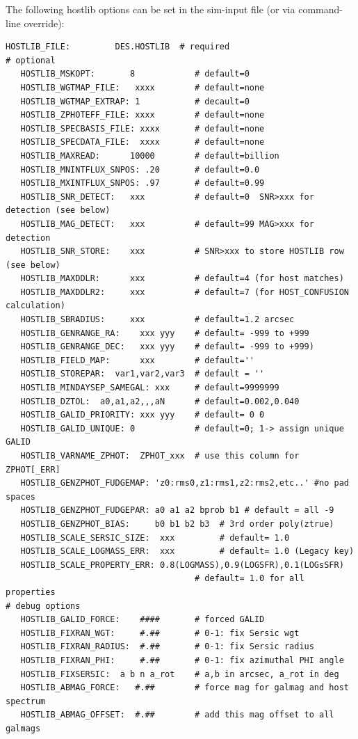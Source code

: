 \documentclass[12pt]{article}
\newcommand{\hostlib}{{\sc hostlib}}
\begin{document}
{The following {\hostlib} options can be set in
the sim-input file (or via command-line override):
%
\begin{Verbatim}[frame=single]
   HOSTLIB_FILE:         DES.HOSTLIB  # required
# optional
   HOSTLIB_MSKOPT:       8            # default=0
   HOSTLIB_WGTMAP_FILE:   xxxx        # default=none
   HOSTLIB_WGTMAP_EXTRAP: 1           # decault=0
   HOSTLIB_ZPHOTEFF_FILE: xxxx        # default=none
   HOSTLIB_SPECBASIS_FILE: xxxx       # default=none
   HOSTLIB_SPECDATA_FILE:  xxxx       # default=none
   HOSTLIB_MAXREAD:      10000        # default=billion
   HOSTLIB_MNINTFLUX_SNPOS: .20       # default=0.0
   HOSTLIB_MXINTFLUX_SNPOS: .97       # default=0.99
   HOSTLIB_SNR_DETECT:   xxx          # default=0  SNR>xxx for detection (see below)
   HOSTLIB_MAG_DETECT:   xxx          # default=99 MAG>xxx for detection
   HOSTLIB_SNR_STORE:    xxx          # SNR>xxx to store HOSTLIB row (see below)
   HOSTLIB_MAXDDLR:      xxx          # default=4 (for host matches)
   HOSTLIB_MAXDDLR2:     xxx          # default=7 (for HOST_CONFUSION calculation)
   HOSTLIB_SBRADIUS:     xxx          # default=1.2 arcsec
   HOSTLIB_GENRANGE_RA:    xxx yyy    # default= -999 to +999
   HOSTLIB_GENRANGE_DEC:   xxx yyy    # default= -999 to +999)   
   HOSTLIB_FIELD_MAP:      xxx        # default=''
   HOSTLIB_STOREPAR:  var1,var2,var3  # default = ''
   HOSTLIB_MINDAYSEP_SAMEGAL: xxx     # default=9999999
   HOSTLIB_DZTOL:  a0,a1,a2,,,aN      # default=0.002,0.040
   HOSTLIB_GALID_PRIORITY: xxx yyy    # default= 0 0 
   HOSTLIB_GALID_UNIQUE: 0            # default=0; 1-> assign unique GALID
   HOSTLIB_VARNAME_ZPHOT:  ZPHOT_xxx  # use this column for ZPHOT[_ERR]
   HOSTLIB_GENZPHOT_FUDGEMAP: 'z0:rms0,z1:rms1,z2:rms2,etc..' #no pad spaces
   HOSTLIB_GENZPHOT_FUDGEPAR: a0 a1 a2 bprob b1 # default = all -9
   HOSTLIB_GENZPHOT_BIAS:     b0 b1 b2 b3  # 3rd order poly(ztrue)
   HOSTLIB_SCALE_SERSIC_SIZE:  xxx         # default= 1.0
   HOSTLIB_SCALE_LOGMASS_ERR:  xxx         # default= 1.0 (Legacy key)
   HOSTLIB_SCALE_PROPERTY_ERR: 0.8(LOGMASS),0.9(LOGSFR),0.1(LOGsSFR)   
                                      # default= 1.0 for all properties
# debug options
   HOSTLIB_GALID_FORCE:    ####       # forced GALID 
   HOSTLIB_FIXRAN_WGT:     #.##       # 0-1: fix Sersic wgt 
   HOSTLIB_FIXRAN_RADIUS:  #.##       # 0-1: fix Sersic radius
   HOSTLIB_FIXRAN_PHI:     #.##       # 0-1: fix azimuthal PHI angle 
   HOSTLIB_FIXSERSIC:  a b n a_rot    # a,b in arcsec, a_rot in deg
   HOSTLIB_ABMAG_FORCE:   #.##        # force mag for galmag and host spectrum
   HOSTLIB_ABMAG_OFFSET:  #.##        # add this mag offset to all galmags

\end{Verbatim}}
\end{document}
